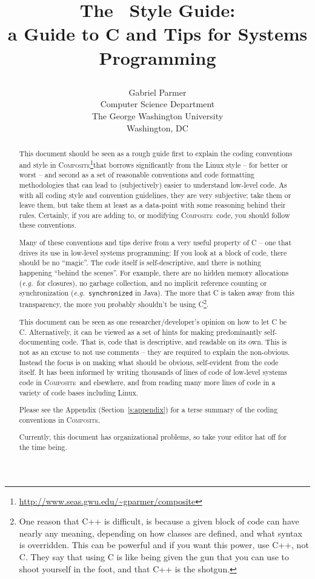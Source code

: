 \documentclass[11pt,onecolumn]{article}
\date{}
\title{\Large\bf The \composite\ Style Guide: \\
a Guide to C and Tips for Systems Programming\\
\author{Gabriel Parmer\\[0.05in]
Computer Science Department \\
The George Washington University\\
Washington, DC
}}
\def\composite{\textsc{Composite}}
\def\eg{\textit{e.g.}}
\begin{document}
\thispagestyle{empty}
\maketitle
\thispagestyle{empty}


%

%

  
\begin{abstract}
  This document should be seen as a rough guide first to explain the
  coding conventions and style in
  \composite\footnote{\url{http://www.seas.gwu.edu/~gparmer/composite}}that
  borrows significantly from the Linux style -- for better or worst --
  and second as a set of reasonable conventions and code formatting
  methodologies that can lead to (subjectively) easier to understand
  low-level code.  As with all coding style and convention guidelines,
  they are very subjective; take them or leave them, but take them at
  least as a data-point with some reasoning behind their rules.
  Certainly, if you are adding to, or modifying \composite\ code, you
  should follow these conventions.

  Many of these conventions and tips derive from a very useful
  property of C -- one that drives its use in low-level systems
  programming: If you look at a block of code, there should be no
  ``magic''.  The code itself is self-descriptive, and there is
  nothing happening ``behind the scenes''.  For example, there are no
  hidden memory allocations (\eg\ for closures), no garbage
  collection, and no implicit reference counting or synchronization
  (\eg\ {\tt synchronized} in Java).  The more that C is taken away
  from this transparency, the more you probably shouldn't be using
  C\footnote{One reason that C++ is difficult, is because a given
    block of code can have nearly any meaning, depending on how
    classes are defined, and what syntax is overridden.  This can be
    powerful and if you want this power, use C++, not C.  They say
    that using C is like being given the gun that you can use to shoot
    yourself in the foot, and that C++ is the shotgun.}.

  This document can be seen as one researcher/developer's opinion on
  how to let C be C.  Alternatively, it can be viewed as a set of
  hints for making predominantly self-documenting code.  That is, code
  that is descriptive, and readable on its own.  This is not as an
  excuse to not use comments -- they are required to explain the
  non-obvious.  Instead the focus is on making what should be obvious,
  self-evident from the code itself.  It has been informed by writing
  thousands of lines of code of low-level systems code in
  \composite\ and elsewhere, and from reading many more lines of code
  in a variety of code bases including Linux.

  Please see the Appendix (Section~\ref{s:appendix}) for a terse
  summary of the coding conventions in \composite.

  Currently, this document has organizational problems, so take your
  editor hat off for the time being.
\end{abstract}
\end{document}
